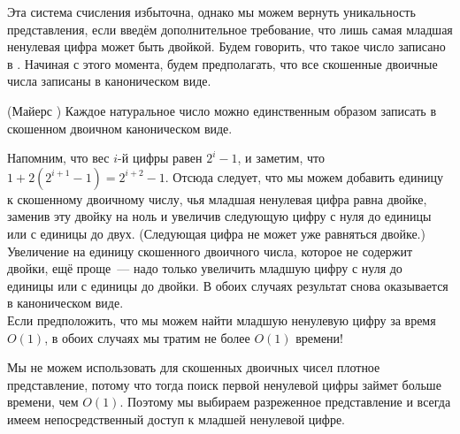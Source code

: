 \begin{frame}[fragile]{}

Эта система счисления избыточна, однако мы можем вернуть уникальность
представления, если введём дополнительное требование, что лишь
самая младшая ненулевая цифра может быть двойкой.  Будем говорить, что
такое число записано в . Начиная с этого момента, будем предполагать, что все
скошенные двоичные числа записаны в каноническом виде.


\begin{theorem}\label{th:9.1}
  (Майерс \cite{Myers1983}) Каждое натуральное число можно
  единственным образом записать в скошенном двоичном каноническом виде.
\end{theorem}
\end{frame}

\begin{frame}[fragile]{}

Напомним, что вес $i$-й цифры равен $2^i - 1$, и заметим, что $1 +
2(2^{i+1} - 1) = 2^{i+2} - 1$. Отсюда следует, что мы можем добавить
единицу к скошенному двоичному числу, чья младшая ненулевая цифра равна двойке,
заменив эту двойку на ноль и увеличив следующую цифру с нуля до
единицы или с единицы до двух. (Следующая цифра не может уже равняться
двойке.) \\

Увеличение на единицу скошенного двоичного числа, которое не
содержит двойки, ещё проще~--- надо только увеличить младшую цифру с
нуля до единицы или с единицы до двойки. В обоих случаях результат
снова оказывается в каноническом виде.\\

 Если предположить, что мы можем
найти младшую ненулевую цифру за время $O(1)$, в обоих случаях мы
тратим не более $O(1)$ времени!
\end{frame}

\begin{frame}[fragile]{}
Мы не можем использовать для скошенных двоичных чисел плотное
представление, потому что тогда поиск первой ненулевой цифры займет
больше времени, чем $O(1)$. Поэтому мы выбираем разреженное
представление и всегда имеем непосредственный доступ к младшей
ненулевой цифре.
\inputminted[firstline=3,lastline=3]{haskell}{code/SkewNumbers.hs}

\end{frame}

